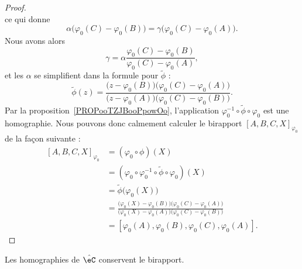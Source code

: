 \begin{proof}
\begin{equation}
	\end{equation}
	ce qui donne
	\begin{equation}
		\alpha\big( \varphi_0(C)-\varphi_0(B) \big)=\gamma\big( \varphi_0(C)-\varphi_0(A) \big).
	\end{equation}
	Nous avons alors
	\begin{equation}
		\gamma=\alpha\frac{ \varphi_0(C)-\varphi_0(B) }{ \varphi_0(C)-\varphi_0(A) },
	\end{equation}
	et les \( \alpha\) se simplifient dans la formule pour \( \tilde \phi\) :
	\begin{equation}
		\tilde \phi(z)=\frac{ \big( z- \varphi_0(B)   \big)\big( \varphi_0(C)-\varphi_0(A) \big) }{ \big( z-\varphi_0(A)\big)\big( \varphi_0(C)-\varphi_0(B) \big) }.
	\end{equation}
	Par la proposition~\ref{PROPooTZJBooPpowOo}, l'application \( \varphi_0^{-1}\circ\tilde \phi\circ\varphi_0\) est une homographie. Nous pouvons donc calmement calculer le birapport \( [A,B,C,X]_{\varphi_0}\) de la façon suivante :
	\begin{subequations}
		\begin{align}
			[A,B,C,X]_{\varphi_0} & =(\varphi_0\circ\phi)(X)                                                                                                                                           \\
			                      & =(\varphi_0\circ\varphi_0^{-1}\circ\tilde \phi\circ\varphi_0)(X)                                                                                                   \\
			                      & =\tilde \phi\big( \varphi_0(X) \big)                                                                                                                               \\
			                      & =\frac{ \big( \varphi_0(X)-\varphi_0(B) \big)\big( \varphi_0(C)-\varphi_0(A) \big) }{ \big( \varphi_0(X)-\varphi_0(A) \big)\big( \varphi_0(C)-\varphi_0(B) \big) } \\
			                      & =[\varphi_0(A),\varphi_0(B),\varphi_0(C),\varphi_0(A)].
		\end{align}
	\end{subequations}
\end{proof}

\begin{proposition}     \label{PROPooQGPFooReNaGq}
	Les homographies de \( \hat \eC\) conservent le birapport.
\end{proposition}

